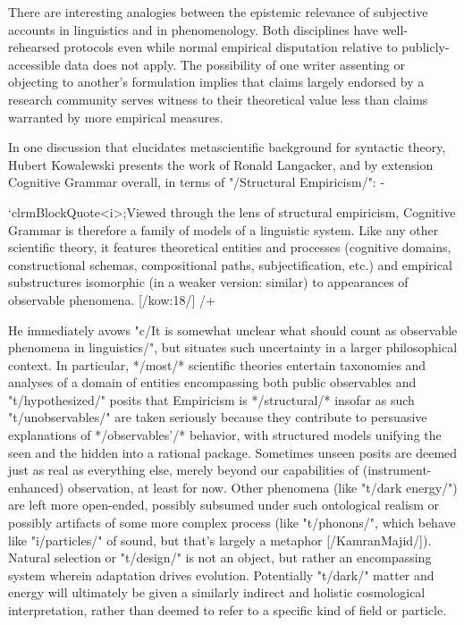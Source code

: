 There are interesting analogies between the epistemic 
relevance of subjective accounts in linguistics 
and in phenomenology.  Both disciplines 
have well-rehearsed protocols even while normal 
empirical disputation relative to publicly-accessible data 
does not apply.  The possibility of one writer assenting 
or objecting to another's formulation implies that 
claims largely endorsed by a research community 
serves witness to their theoretical value %
less than claims warranted by more empirical measures.

In one discussion that elucidates metascientific 
background for syntactic theory, Hubert Kowalewski 
presents the work of Ronald Langacker, and by extension 
Cognitive Grammar overall, in terms of "/Structural Empiricism/": -%

`clrmBlockQuote<i>;Viewed through the lens of structural empiricism, Cognitive Grammar
is therefore a family of models of a linguistic system.  Like any other scientific theory, 
it features theoretical entities and processes (cognitive domains,
constructional schemas, compositional paths, subjectification, etc.) 
and empirical substructures isomorphic (in a weaker version: similar) to appearances
of observable phenomena. [/kow:18/]
/+

He immediately avows "c/It is somewhat unclear what should count as observable phenomena in 
linguistics/", but situates such uncertainty in a larger philosophical context.  
In particular, */most/* scientific theories entertain taxonomies and analyses of 
a domain of entities encompassing both public observables and "t/hypothesized/" 
posits that %
Empiricism is */structural/* insofar as such "t/unobservables/" are 
taken seriously because they contribute to persuasive explanations 
of */observables'/* behavior, with structured models unifying the seen 
and the hidden into a rational package.  Sometimes unseen posits are 
deemed just as real as everything else, merely beyond our capabilities 
of (instrument-enhanced) observation, at least for now.  Other phenomena 
(like "t/dark energy/") are left more open-ended, possibly subsumed under 
such ontological realism or possibly artifacts of some more complex process 
(like "t/phonons/", which behave like "i/particles/" of sound, but 
that's largely a metaphor [/KamranMajid/]).  Natural selection or "t/design/" 
is not an object, but rather an encompassing system wherein adaptation drives 
evolution.  Potentially "t/dark/" matter and energy will ultimately 
be given a similarly indirect and holistic cosmological interpretation, 
rather than deemed to refer to a specific kind of field or particle.  

